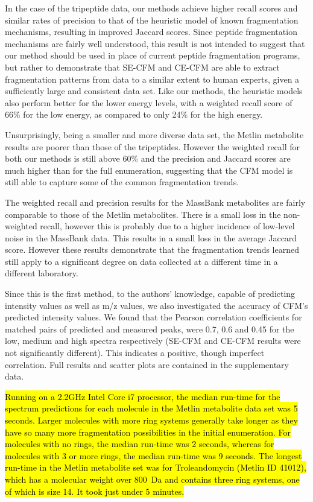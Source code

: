 In the case of the tripeptide data, our methods achieve higher recall scores and similar rates of precision to that of the heuristic model of known fragmentation mechanisms, resulting in improved Jaccard scores.
Since peptide fragmentation mechanisms are fairly well understood, this result is not intended to suggest that our method should be used in place of current peptide fragmentation programs, but rather to demonstrate that SE-CFM and CE-CFM are able to extract fragmentation patterns from data to a similar extent to human experts, given a sufficiently large and consistent data set. Like our methods, the heuristic models also perform better for the lower energy levels, with a weighted recall score of 66\% for the low energy, as compared to only 24\% for the high energy.

Unsurprisingly, being a smaller and more diverse data set, the Metlin metabolite results are poorer than those of the tripeptides. However the weighted recall for both our methods is still above 60\% and the precision and Jaccard scores are much higher than for the full enumeration, suggesting that the CFM model is still able to capture some of the common fragmentation trends. 

The weighted recall and precision results for the MassBank metabolites are fairly comparable to those of the Metlin metabolites. There is a small loss in the non-weighted recall, however this is probably due to a higher incidence of low-level noise in the MassBank data. This results in a small loss in the average Jaccard score. However these results demonstrate that the fragmentation trends learned still apply to a significant degree on data collected at a different time in a different laboratory.



Since this is the first method, to the authors' knowledge, capable of predicting intensity values as well as m/z values, we also investigated the accuracy of CFM's predicted intensity values. We found that the Pearson correlation coefficients for matched pairs of predicted and measured peaks, were 0.7, 0.6 and 0.45 for the low, medium and high spectra respectively (SE-CFM and CE-CFM results were not significantly different). This indicates a positive, though imperfect correlation. Full results and scatter plots are contained in the supplementary data.

\hl{Running on a 2.2GHz Intel Core i7 processor, the median run-time for the spectrum predictions for each molecule in the Metlin metabolite data set was 5 seconds. Larger molecules with more ring systems generally take longer as they have so many more fragmentation possibilities in the initial enumeration. For molecules with no rings, the median run-time was 2 seconds, whereas for molecules with 3 or more rings, the median run-time was 9 seconds. The longest run-time in the Metlin metabolite set was for Troleandomycin (Metlin ID 41012), which has a molecular weight over 800~Da and contains three ring systems, one of which is size 14. It took just under 5 minutes.}

